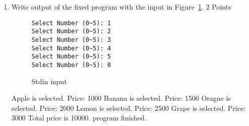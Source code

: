 \begin{enumerate}
\begin{solution}{5cm}
\end{solution}
\item Write output of the fixed program with the input in Figure~\ref{cli_input2}. \hfill 2 Points
\begin{figure}[h]
\centering
\begin{varwidth}{\linewidth}
\begin{verbatim}
Select Number (0~5): 1
Select Number (0~5): 2
Select Number (0~5): 3
Select Number (0~5): 4
Select Number (0~5): 5
Select Number (0~5): 0
\end{verbatim}
\end{varwidth}
\caption{Stdin input}
\label{cli_input2}
\end{figure}
\begin{solution}{5cm}
Apple is selected. Price: 1000\newline
Banana is selected. Price: 1500\newline
Oragne is selected. Price: 2000\newline
Lemon is selected. Price: 2500\newline
Grape is selected. Price: 3000\newline
Total price is 10000.
program finished.
\end{solution}
\end{enumerate}
\clearpage